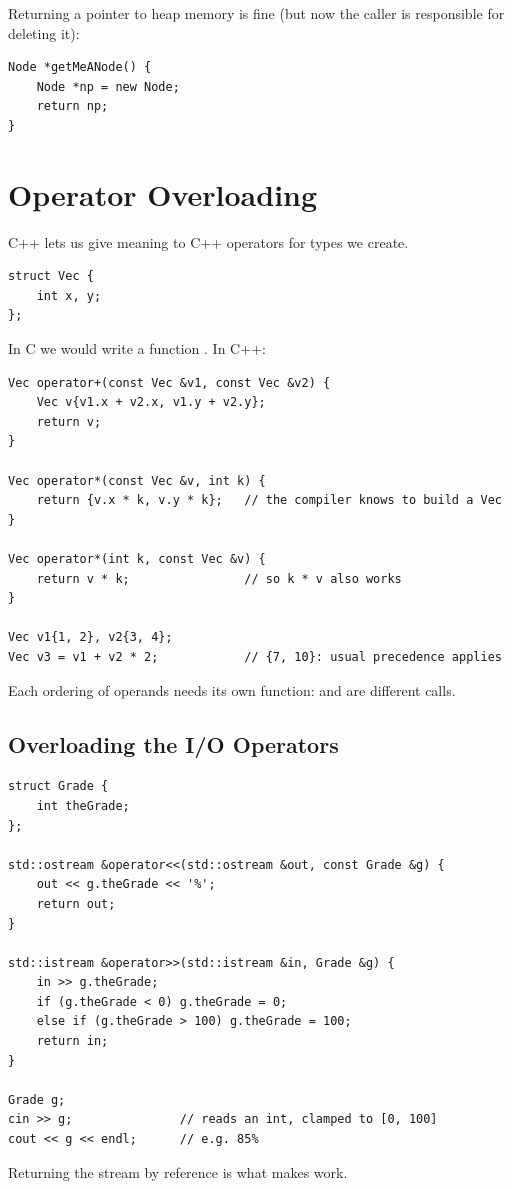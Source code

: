 Returning a pointer to heap memory is fine (but now the caller is responsible for
deleting it):
\begin{lstlisting}[style=cpp]
Node *getMeANode() {
    Node *np = new Node;
    return np;
}
\end{lstlisting}

\section{Operator Overloading}
C++ lets us give meaning to C++ operators for types we create.
\begin{lstlisting}[style=cpp]
struct Vec {
    int x, y;
};
\end{lstlisting}
In C we would write a function . In C++:
\begin{lstlisting}[style=cpp]
Vec operator+(const Vec &v1, const Vec &v2) {
    Vec v{v1.x + v2.x, v1.y + v2.y};
    return v;
}

Vec operator*(const Vec &v, int k) {
    return {v.x * k, v.y * k};   // the compiler knows to build a Vec
}

Vec operator*(int k, const Vec &v) {
    return v * k;                // so k * v also works
}

Vec v1{1, 2}, v2{3, 4};
Vec v3 = v1 + v2 * 2;            // {7, 10}: usual precedence applies
\end{lstlisting}
Each ordering of operands needs its own function:  and 
are different calls.

\subsection{Overloading the I/O Operators}
\begin{lstlisting}[style=cpp]
struct Grade {
    int theGrade;
};

std::ostream &operator<<(std::ostream &out, const Grade &g) {
    out << g.theGrade << '%';
    return out;
}

std::istream &operator>>(std::istream &in, Grade &g) {
    in >> g.theGrade;
    if (g.theGrade < 0) g.theGrade = 0;
    else if (g.theGrade > 100) g.theGrade = 100;
    return in;
}

Grade g;
cin >> g;               // reads an int, clamped to [0, 100]
cout << g << endl;      // e.g. 85%
\end{lstlisting}
Returning the stream by reference is what makes  work.

